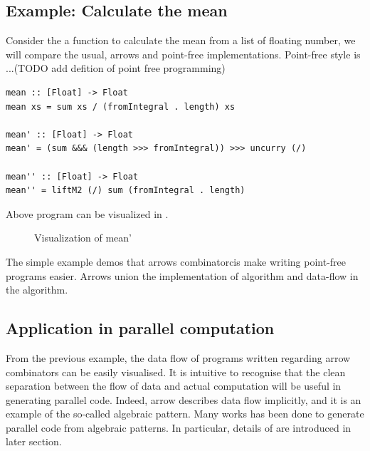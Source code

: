 \subsection{Example: Calculate the mean}
Consider the a function to calculate the mean from a list of floating number, we will compare the usual, arrows and point-free implementations. Point-free style is ...(TODO add defition of point free programming)
\begin{verbatim}
mean :: [Float] -> Float
mean xs = sum xs / (fromIntegral . length) xs

mean' :: [Float] -> Float
mean' = (sum &&& (length >>> fromIntegral)) >>> uncurry (/)

mean'' :: [Float] -> Float
mean'' = liftM2 (/) sum (fromIntegral . length)
\end{verbatim}
Above program can be visualized in .
\begin{figure}[ht]
  \centering
  \caption{Visualization of mean'}\label{b:ar:p2}
\end{figure}
The simple example demos that arrows combinatorcis make writing point-free programs easier. Arrows union the implementation of algorithm and data-flow in the algorithm. 

\subsection{Application in parallel computation}
From the previous example, the data flow of programs written regarding arrow combinators can be easily visualised. It is intuitive to recognise that the clean separation between the flow of data and actual computation will be useful in generating parallel code. Indeed, arrow describes data flow implicitly, and it is an example of the so-called algebraic pattern. Many works \cite{braunArrowsParallelComputation2018, elliottGenericFunctionalParallel2017b, AlgebraicMultipartyProtocol} has been done to generate parallel code from algebraic patterns.
In particular, details of \cite{AlgebraicMultipartyProtocol} are introduced in later section. %

